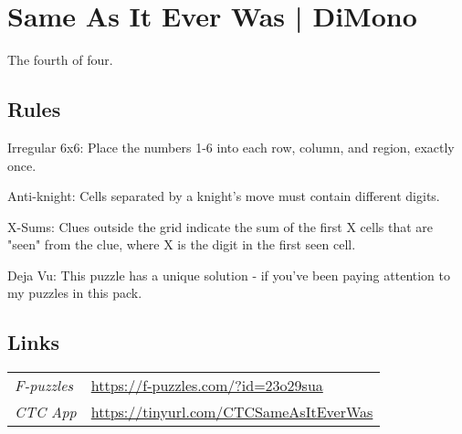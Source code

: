 \section{Same As It Ever Was | {\normalfont DiMono}}
\label{sec:09-same-as-it-ever-was-dimono}
The fourth of four.
\subsection*{Rules}
\begin{markdown}
Irregular 6x6: Place the numbers 1-6 into each row, column, and region, exactly once.



Anti-knight: Cells separated by a knight's move must contain different digits.



X-Sums: Clues outside the grid indicate the sum of the first X cells that are "seen" from the clue, where X is the digit in the first seen cell.



Deja Vu: This puzzle has a unique solution - if you've been paying attention to my puzzles in this pack.
\end{markdown}
\subsection*{Links}
\begin{tabularx}{\textwidth}{l X}
\emph{F-puzzles} & \url{https://f-puzzles.com/?id=23o29sua} \\
\emph{CTC App} & \url{https://tinyurl.com/CTCSameAsItEverWas} \\
\end{tabularx}
\pagebreak
